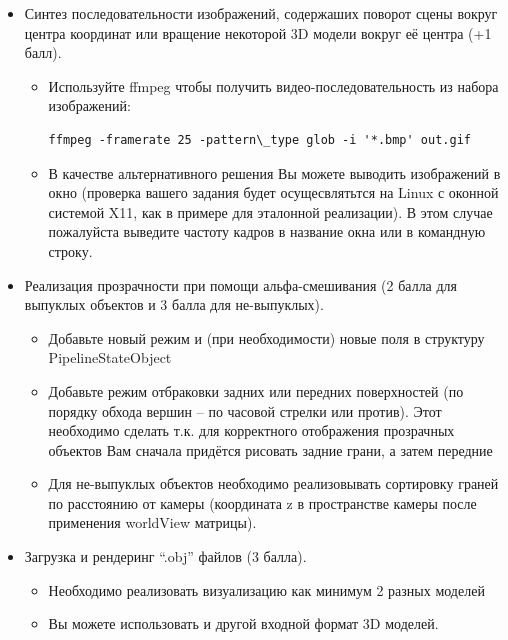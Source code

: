 \documentclass[12pt,subf,href,colorlinks=true]{article}
\begin{document}
\begin{itemize}
	
	\item Синтез последовательности изображений, содержаших поворот сцены вокруг центра координат или вращение некоторой 3D модели вокруг её центра (+1 балл). 
  
    \begin{itemize}
    \item Используйте ffmpeg чтобы получить видео-последовательность из набора изображений:
    \begin{verbatim}ffmpeg -framerate 25 -pattern\_type glob -i '*.bmp' out.gif \end{verbatim}
    
    \item В качестве альтернативного решения Вы можете выводить изображений в окно (проверка вашего задания будет осущесвлятьтся на Linux с оконной системой X11, как в примере для эталонной реализации). В этом случае пожалуйста выведите частоту кадров в название окна или в командную строку.
    \end{itemize}
    
    \item Реализация прозрачности при помощи альфа-смешивания (2 балла для выпуклых объектов и 3 балла для не-выпуклых).
    
    \begin{itemize}
    	\item Добавьте новый режим и (при необходимости) новые поля в структуру \newline PipelineStateObject
    	
    	\item Добавьте режим отбраковки задних или передних поверхностей (по порядку обхода вершин -- по часовой стрелки или против). Этот необходимо сделать т.к. для корректного отображения прозрачных объектов Вам сначала придётся рисовать задние грани, а затем передние
    	
    	\item Для не-выпуклых объектов необходимо реализовывать сортировку граней по расстоянию от камеры (координата z в пространстве камеры после применения worldView матрицы). 
    \end{itemize}
    
	\item Загрузка и рендеринг ``.obj'' файлов (3 балла).
    \begin{itemize}
    	\item Необходимо реализовать визуализацию как минимум 2 разных моделей
    	\item Вы можете использовать и другой входной формат 3D моделей.
    \end{itemize}		
		

\end{itemize}
\end{document}

